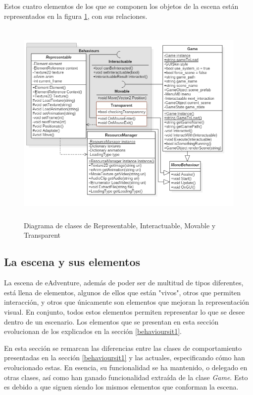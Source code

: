 Estos cuatro elementos de los que se componen los objetos de la escena están representados en la figura \ref{behavioursit2}, con sus relaciones.

\begin{figure}[h!]
	\centerline{\includegraphics[height=4in]{figures/it2/Behaviours.png}}
	\caption[Representable, Interactuable, Movable y Transparent - Versión Final]{Diagrama de clases de Representable, Interactuable, Movable y Transparent}
	\label{behavioursit2}
\end{figure}

\newpage

\subsection{La escena y sus elementos}

La escena de eAdventure, además de poder ser de multitud de tipos diferentes, está llena de elementos, algunos de ellos que están "vivos", otros que permiten interacción, y otros que únicamente son elementos que mejoran la representación visual. En conjunto, todos estos elementos permiten representar lo que se desee dentro de un escenario. Los elementos que se presentan en esta sección evolucionan de los explicados en la sección \ref{behavioursit1}.

En esta sección se remarcan las diferencias entre las clases de comportamiento presentadas en la sección \ref{behavioursit1} y las actuales, especificando cómo han evolucionado estas. En esencia, su funcionalidad se ha mantenido, o delegado en otras clases, así como han ganado funcionalidad extraída de la clase \textit{Game}. Esto es debido a que siguen siendo los mismos elementos que conforman la escena.

